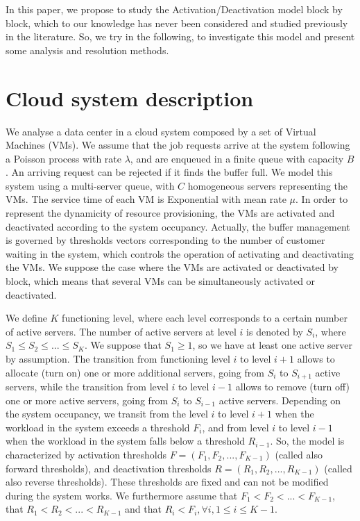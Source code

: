 \documentclass[conference]{IEEEtran}
\begin{document}
In this paper, we propose to study the Activation/Deactivation model block by block, which to our knowledge has never been considered and studied
previously in the literature. So, we try in the following, to investigate this model and present some analysis and resolution methods.


\section{Cloud system description} \label{sec:ModelDet}



We analyse  a data center in a cloud system composed by a set of Virtual Machines (VMs). We assume that the job requests arrive at the system 
following a Poisson process with rate $\lambda$, and are enqueued in a finite queue with capacity $B$. An arriving request can be rejected if 
it finds the buffer full. 
We model this system  using a multi-server queue,  with $C$ homogeneous servers representing the VMs. The service time of each VM  is Exponential 
with mean rate $\mu$. In order to represent the dynamicity of resource provisioning, the VMs are activated and deactivated according to the system 
occupancy. Actually, the buffer management is governed by thresholds vectors corresponding to the number of customer waiting in the system, which 
controls the operation of activating and deactivating the VMs. We suppose the case where the VMs are activated or deactivated by block, which means 
that several VMs can be simultaneously activated or deactivated.  

We define   $K$ functioning level, where each level corresponds to a certain number of active servers. The number of active servers at level $i$ is 
denoted by $S_i$, where $S_{1} \leq S_{2} \leq ... \leq S_{K}$. We suppose that $S_1 \geq 1$, so we have  at least  one active server by assumption.
The transition from functioning level $i$ to level $i+1$ allows to allocate (turn on) one or more additional servers, going from 
$S_i$ to $S_{i+1}$ active servers, while the transition from level $i$ to level $i-1$ allows to remove (turn off) one or more active servers, 
going from $S_i$ to $S_{i-1}$ active servers. Depending on the system occupancy, we transit from the level $i$ to level $i+1$ when the workload in 
the system exceeds a threshold $F_{i}$, and from level $i$ to level $i-1$ when the workload in the system falls below a threshold  $R_{i-1}$. 
So, the model is characterized by activation thresholds  $F=(F_{1}, F_{2}, ..., F_{K-1})$ (called also forward thresholds), and deactivation 
thresholds $R=(R_{1}, R_{2}, ..., R_{K-1})$ (called also reverse thresholds). 
These thresholds are fixed and can not be modified during the system works.
We furthermore assume  that $F_{1}<F_{2}< ...<F_{K-1}$, that $R_{1}<R_{2}< ...<R_{K-1}$ and that $R_{i}<F_{i}, \forall i, 1 \leq i \leq K-1$.
\end{document}
